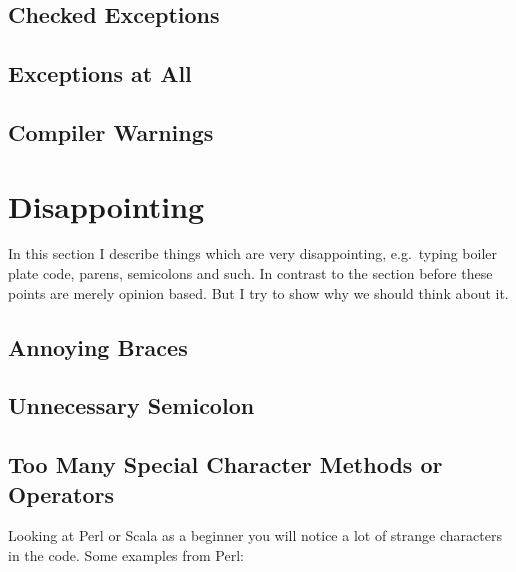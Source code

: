 \documentclass[11pt, a4paper]{report}
\begin{document}
\subsection{Checked Exceptions}


\subsection{Exceptions at All}


\subsection{Compiler Warnings}


\section{Disappointing}

In this section I describe things which are very disappointing, e.g.\ typing boiler plate code, parens, semicolons and such. In contrast to the section before these points are merely opinion based. But I try to show why we should think about it.

\subsection{Annoying Braces}


\subsection{Unnecessary Semicolon}


\subsection{Too Many Special Character Methods or Operators}

Looking at Perl or Scala as a beginner you will notice a lot of strange characters in the code. Some examples from Perl\cite{secret-perl-operators}:
\end{document}
